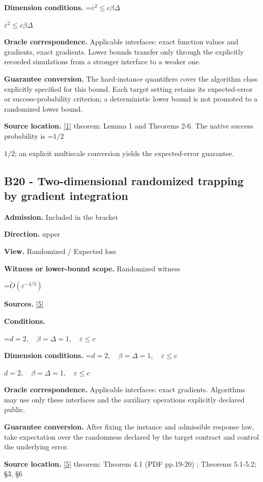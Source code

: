 \documentclass[10pt,a4paper]{article}
\newcommand{\AtlasMath}[1]{\par\begingroup\centering\setbox0=\hbox{$\displaystyle #1$}\ifdim\wd0>1.4\linewidth\typeout{ATLAS WIDE FORMULA: \the\wd0}\fi\ifdim\wd0>\linewidth\resizebox{\linewidth}{!}{\box0}\else\box0\fi\par\endgroup}
\newcommand{\AtlasInlineMath}[1]{\begingroup\setbox0=\hbox{$#1$}\ifdim\wd0>.4\linewidth\endgroup\AtlasMath{#1}\else\endgroup$#1$\fi}
\begin{document}
\textbf{Dimension conditions.} \AtlasInlineMath{\varepsilon^2\le c\beta\Delta}

\textbf{Oracle correspondence.} Applicable interfaces: exact function values and gradients, exact gradients. Lower bounds transfer only through the explicitly recorded simulations from a stronger interface to a weaker one.

\textbf{Guarantee conversion.} The hard-instance quantifiers cover the algorithm class explicitly specified for this bound. Each target setting retains its expected-error or success-probability criterion; a deterministic lower bound is not promoted to a randomized lower bound.

\textbf{Source location.} \href{https://arxiv.org/pdf/2209.07513}{[1]} theorem: Lemma 1 and Theorems 2-6. The native success probability is \AtlasInlineMath{1/2}; an explicit multiscale conversion yields the expected-error guarantee.

\subsection{B20 - Two-dimensional randomized trapping by gradient integration}
\textbf{Admission.} Included in the bracket

\textbf{Direction.} upper

\textbf{View.} Randomized / Expected loss

\textbf{Witness or lower-bound scope.} Randomized witness

\AtlasMath{\widetilde{O}(\varepsilon^{-4/3})}
\textbf{Sources.} \href{https://arxiv.org/pdf/2610.02791}{[5]}

\textbf{Conditions.} 


\AtlasMath{d=2,\quad\beta=\Delta=1,\quad\varepsilon\le c}




\textbf{Dimension conditions.} \AtlasInlineMath{d=2,\quad\beta=\Delta=1,\quad\varepsilon\le c}

\textbf{Oracle correspondence.} Applicable interfaces: exact gradients. Algorithms may use only these interfaces and the auxiliary operations explicitly declared public.

\textbf{Guarantee conversion.} After fixing the instance and admissible response law, take expectation over the randomness declared by the target contract and control the underlying error.

\textbf{Source location.} \href{https://arxiv.org/pdf/2610.02791}{[5]} theorem: Theorem 4.1 (PDF pp.19-20) ; Theorems 5.1-5.2; §3, §6
\end{document}
